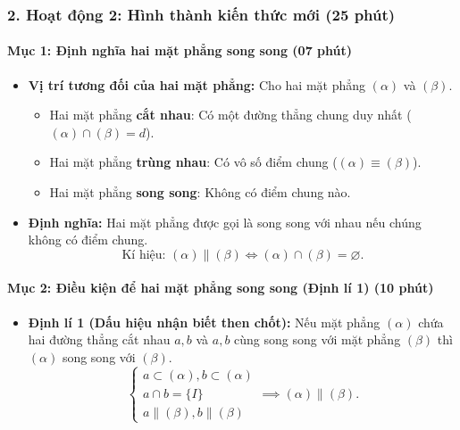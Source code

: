 \documentclass[12pt, a4paper]{article}
\begin{document}
\subsubsection*{2. Hoạt động 2: Hình thành kiến thức mới (25 phút)}

\paragraph{Mục 1: Định nghĩa hai mặt phẳng song song (07 phút)}
\begin{itemize}
    \item \textbf{Vị trí tương đối của hai mặt phẳng:} Cho hai mặt phẳng $(\alpha)$ và $(\beta)$.
    \begin{itemize}
        \item Hai mặt phẳng \textbf{cắt nhau}: Có một đường thẳng chung duy nhất ($(\alpha) \cap (\beta) = d$).
        \item Hai mặt phẳng \textbf{trùng nhau}: Có vô số điểm chung ($(\alpha) \equiv (\beta)$).
        \item Hai mặt phẳng \textbf{song song}: Không có điểm chung nào.
    \end{itemize}
    \item \textbf{Định nghĩa:} Hai mặt phẳng được gọi là song song với nhau nếu chúng không có điểm chung.
    $$\text{Kí hiệu: } (\alpha) \parallel (\beta) \iff (\alpha) \cap (\beta) = \varnothing.$$
\end{itemize}

\begin{center}
\end{center}

\paragraph{Mục 2: Điều kiện để hai mặt phẳng song song (Định lí 1) (10 phút)}
\begin{itemize}
    \item \textbf{Định lí 1 (Dấu hiệu nhận biết then chốt):} Nếu mặt phẳng $(\alpha)$ chứa hai đường thẳng cắt nhau $a, b$ và $a, b$ cùng song song với mặt phẳng $(\beta)$ thì $(\alpha)$ song song với $(\beta)$.
    $$\begin{cases} a \subset (\alpha), b \subset (\alpha) \\ a \cap b = \{I\} \\ a \parallel (\beta), b \parallel (\beta) \end{cases} \implies (\alpha) \parallel (\beta).$$
\end{itemize}
\end{document}
